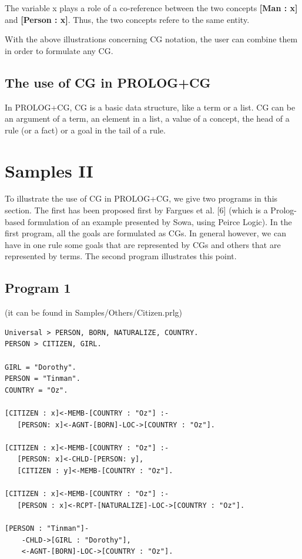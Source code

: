 \documentclass{book}
\begin{document}
The variable x plays a role of a co-reference between the two
concepts {\bf [Man : x]} and {\bf [Person : x]}.
Thus, the two concepts refere to the same entity.

With the above illustrations concerning CG notation, the user can
combine them in order to formulate any CG.

\subsection{The use of CG in PROLOG+CG}

In PROLOG+CG, CG is a basic data structure, like a term or a
list. CG can be an argument of a term, an element in a list, a value
of a concept, the head of a rule (or a fact) or a goal in the tail of
a rule.

\section{Samples II}\label{Sec:SamplesII}

To illustrate the use of CG in PROLOG+CG, we give two programs in this
section. The first has been proposed first by Fargues et al. [6]
(which is a Prolog-based formulation of an example presented by Sowa,
using Peirce Logic). In the first program, all the goals are
formulated as CGs. In general however, we can have in one rule some
goals that are represented by CGs and others that are represented by
terms. The second program illustrates this point.

\subsection{Program 1}

(it can be found in Samples/Others/Citizen.prlg)


\begin{verbatim}
Universal > PERSON, BORN, NATURALIZE, COUNTRY.
PERSON > CITIZEN, GIRL.

GIRL = "Dorothy".
PERSON = "Tinman".
COUNTRY = "Oz".

[CITIZEN : x]<-MEMB-[COUNTRY : "Oz"] :-
   [PERSON: x]<-AGNT-[BORN]-LOC->[COUNTRY : "Oz"].

[CITIZEN : x]<-MEMB-[COUNTRY : "Oz"] :-
   [PERSON: x]<-CHLD-[PERSON: y], 
   [CITIZEN : y]<-MEMB-[COUNTRY : "Oz"].

[CITIZEN : x]<-MEMB-[COUNTRY : "Oz"] :-
   [PERSON : x]<-RCPT-[NATURALIZE]-LOC->[COUNTRY : "Oz"].

[PERSON : "Tinman"]-
    -CHLD->[GIRL : "Dorothy"], 
    <-AGNT-[BORN]-LOC->[COUNTRY : "Oz"].
\end{verbatim}
\end{document}
